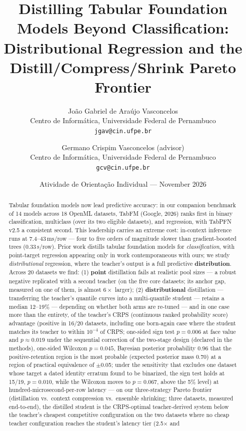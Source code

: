 \documentclass[11pt]{article}
\title{\textbf{Distilling Tabular Foundation Models Beyond Classification:\\
Distributional Regression and the Distill/Compress/Shrink Pareto Frontier}}
\author{João Gabriel de Araújo Vasconcelos\\
  \small Centro de Informática, Universidade Federal de Pernambuco\\
  \small \texttt{jgav@cin.ufpe.br}
  \and
  Germano Crispim Vasconcelos (advisor)\\
  \small Centro de Informática, Universidade Federal de Pernambuco\\
  \small \texttt{gcv@cin.ufpe.br}}
\date{Atividade de Orientação Individual --- November 2026}
\newcommand{\us}{\textmu s}
\begin{document}
\maketitle

\begin{abstract}
Tabular foundation models now lead predictive accuracy: in our companion
benchmark of 14 models across 18 OpenML datasets, TabFM (Google, 2026) ranks
first in binary classification, multiclass (over its two eligible
datasets), and regression, with TabPFN v2.5
a consistent second. This leadership carries an extreme cost: in-context
inference runs at 7.4--43\,ms/row --- four to five orders of magnitude slower
than gradient-boosted trees (0.33\,\us/row). Prior work distills tabular
foundation models for \emph{classification}, with point-target regression
appearing only in work contemporaneous with ours; we study
\emph{distributional} regression, where the teacher's output is a full
predictive \textbf{distribution}. Across 20
datasets we find: (1) \textbf{point} distillation fails at realistic pool
sizes --- a robust negative replicated with a second teacher (on the
five core datasets; its anchor gap, measured on one of them, is almost
$6\times$ larger); (2) \textbf{distributional} distillation --- transferring the
teacher's quantile curves into a multi-quantile student --- retains a
median 12--19\% --- depending on whether both arms are re-tuned ---
and in one case more than the entirety, of the teacher's
CRPS (continuous ranked probability score) advantage (positive in 16/20
datasets, including one born-again case where the student matches
its
teacher to within $10^{-4}$ of CRPS; one-sided sign test $p = 0.006$ at face value and
$p \approx 0.019$ under the sequential correction of the two-stage
design (declared in the methods), one-sided Wilcoxon $p = 0.045$, Bayesian
posterior probability $0.96$ that the positive-retention region is
the most probable (expected posterior
mass $0.70$) at a region of practical equivalence of
$\pm$0.05; under the sensitivity that
excludes one dataset whose target a dated identity erratum found to be
binarized, the sign test holds at 15/19, $p = 0.010$, while the
Wilcoxon moves to $p = 0.067$, above the 5\% level) at
hundred-microsecond-per-row latency --- on our three-strategy Pareto
frontier (distillation vs.\ context compression vs.\ ensemble
shrinking; three datasets, measured end-to-end), the distilled student
is the CRPS-optimal teacher-derived system below the teacher's cheapest competitive
configuration on the two datasets where no cheap teacher
configuration reaches the student's latency tier (2.5$\times$ and

\end{abstract}
\end{document}
